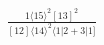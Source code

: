 \documentclass[varwidth, border=5pt]{standalone}
\begin{document}
\begin{my}
$\begin{gathered}
\scriptscriptstyle\frac{1⟨15⟩^2[13]^2}{[12]⟨14⟩^2⟨1|2+3|1]}
\end{gathered}$
\end{my}
\end{document}

